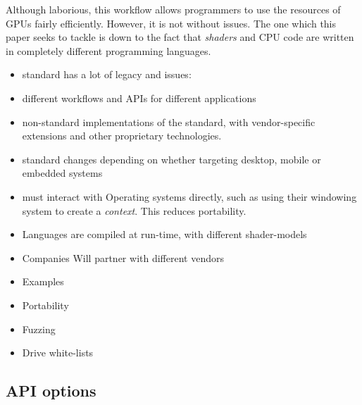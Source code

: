 \documentclass[a4paper,12pt,twoside,openright]{report}
\begin{document}
Although laborious, this workflow allows programmers to use the resources of
GPUs fairly efficiently. However, it is not without issues. The one which this
paper seeks to tackle is down to the fact that \textit{shaders} and CPU code
are written in completely different programming languages.

\begin{itemize}

    \item standard has a lot of legacy and issues:

        \item different workflows and APIs for different applications

        \item non-standard implementations of the standard, with
        vendor-specific extensions and other proprietary technologies.

    \item standard changes depending on whether targeting desktop, mobile
    or embedded systems

    \item must interact with Operating systems directly, such as using
    their windowing system to create a \textit{context}. This reduces
    portability.

    \item Languages are compiled at run-time, with different shader-models

    \item Companies Will partner with different vendors

    \item Examples

    \item Portability

    \item Fuzzing \cite{GLFuzz}

    \item Drive white-lists \cite{NVIDIAInternshipLessons}

\end{itemize}

\subsection{API options}

\label{sec:api_options}
\end{document}
